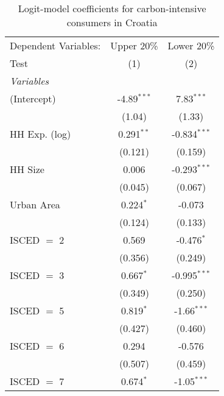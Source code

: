 
\begin{table}[htbp!]
   \centering
   \small
   \begin{adjustbox}{width = 1\textwidth, max height = 0.95\textheight, center}
      \begin{threeparttable}[b]
         \caption{\label{tab:Logit_1_HRV} Logit-model coefficients for carbon-intensive consumers in Croatia}
         \begin{tabular}{lcc}
            \tabularnewline \midrule \midrule
            Dependent Variables: & Upper 20\%    & Lower 20\%\\   
            Test                 & (1)           & (2)\\  
            \midrule
            \emph{Variables}\\
            (Intercept)          & -4.89$^{***}$ & 7.83$^{***}$\\   
                                 & (1.04)        & (1.33)\\   
            HH Exp. (log)        & 0.291$^{**}$  & -0.834$^{***}$\\   
                                 & (0.121)       & (0.159)\\   
            HH Size              & 0.006         & -0.293$^{***}$\\   
                                 & (0.045)       & (0.067)\\   
            Urban Area           & 0.224$^{*}$   & -0.073\\   
                                 & (0.124)       & (0.133)\\   
            ISCED $=$ 2          & 0.569         & -0.476$^{*}$\\   
                                 & (0.356)       & (0.249)\\   
            ISCED $=$ 3          & 0.667$^{*}$   & -0.995$^{***}$\\   
                                 & (0.349)       & (0.250)\\   
            ISCED $=$ 5          & 0.819$^{*}$   & -1.66$^{***}$\\   
                                 & (0.427)       & (0.460)\\   
            ISCED $=$ 6          & 0.294         & -0.576\\   
                                 & (0.507)       & (0.459)\\   
            ISCED $=$ 7          & 0.674$^{*}$   & -1.05$^{***}$\\   

\end{tabular}
\end{threeparttable}
\end{adjustbox}
\end{table}
